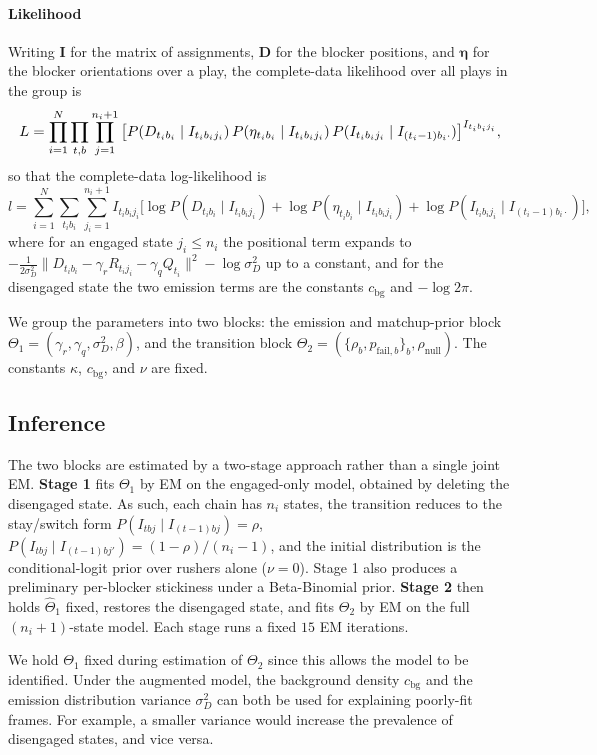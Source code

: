 \documentclass[USenglish]{article}
\let\OldSubsection\subsection
\renewcommand{\subsection}{\FloatBarrier\OldSubsection}
\theoremstyle{dgthm}
\theoremstyle{dgdef}
\begin{document}
\begin{appendices}
\paragraph{Likelihood} Writing $\mathbf{I}$ for the matrix of assignments, $\mathbf{D}$ for the blocker positions, and $\boldsymbol{\eta}$ for the blocker orientations over a play, the complete-data likelihood over all plays in the group is
\[
\resizebox{\textwidth}{!}{$\displaystyle L = \prod_{i=1}^{N} \prod_{t,b} \prod_{j=1}^{n_i+1} \big[ P(D_{t_ib_i} \mid I_{t_i b_i j_i}) \, P(\eta_{t_ib_i} \mid I_{t_ib_ij_i}) \, P(I_{t_ib_ij_i} \mid I_{(t_i-1)b_i\cdot}) \big]^{I_{t_ib_ij_i}},$}
\]
so that the complete-data log-likelihood is
$$ l = \sum_{i=1}^{N} \sum_{t_ib_i} \sum_{j_i=1}^{n_i+1} I_{t_ib_ij_i}\Big[ \log P(D_{t_ib_i} \mid I_{t_ib_ij_i}) + \log P(\eta_{t_ib_i} \mid I_{t_ib_ij_i}) + \log P(I_{t_ib_ij_i} \mid I_{(t_i-1)b_i\cdot}) \Big], $$
where for an engaged state $j_i \le n_i$ the positional term expands to $-\tfrac{1}{2\sigma^2_D}\lVert D_{t_ib_i} - \gamma_r R_{t_ij_i} - \gamma_q Q_{t_i}\rVert^2 - \log\sigma^2_D$ up to a constant, and for the disengaged state the two emission terms are the constants $c_{\text{bg}}$ and $-\log 2\pi$. 

We group the parameters into two blocks: the emission and matchup-prior block $\Theta_1 = (\gamma_r, \gamma_q, \sigma^2_D, \beta)$, and the transition block $\Theta_2 = (\{\rho_b, p_{\text{fail},b}\}_b, \rho_{\text{null}})$. The constants $\kappa$, $c_{\text{bg}}$, and $\nu$ are fixed.

\subsection{Inference} \label{sec:inference}
The two blocks are estimated by a two-stage approach rather than a single joint EM. \textbf{Stage 1} fits $\Theta_1$ by EM on the engaged-only model, obtained by deleting the disengaged state. As such, each chain has $n_i$ states, the transition reduces to the stay/switch form $P(I_{tbj} \mid I_{(t-1)bj}) = \rho$, $P(I_{tbj} \mid I_{(t-1)bj'}) = (1-\rho)/(n_i - 1)$, and the initial distribution is the conditional-logit prior over rushers alone ($\nu = 0$). Stage 1 also produces a preliminary per-blocker stickiness under a Beta-Binomial prior. \textbf{Stage 2} then holds $\hat\Theta_1$ fixed, restores the disengaged state, and fits $\Theta_2$ by EM on the full $(n_i+1)$-state model. Each stage runs a fixed $15$ EM iterations.

We hold $\Theta_1$ fixed during estimation of $\Theta_2$ since this allows the model to be identified. Under the augmented model, the background density $c_{\text{bg}}$ and the emission distribution variance $\sigma^2_D$ can both be used for explaining poorly-fit frames. For example, a smaller variance would increase the prevalence of disengaged states, and vice versa. 


\end{appendices}
\end{document}
